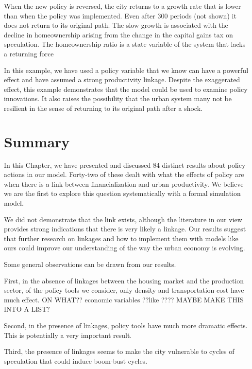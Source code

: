 {When the new policy is reversed, the city returns to a growth rate that is lower than when the policy was implemented. Even after 300 periods (not shown) it does not return to its original path. The slow growth is associated with the decline in homeownership arising from the change in the capital gains tax on speculation. 
The homeownership ratio is a state variable of the system that lacks a returning force

In this example, we have used a policy variable that we know can have a powerful effect and have assumed a strong productivity linkage. Despite the exaggerated effect, this example demonstrates that the model  could be used to examine policy innovations. It also raises the possibility that the urban system many not be resilient in the sense of returning to its original path after a shock.


\section{Summary}
In this Chapter, we have presented and discussed 84 distinct results about policy actions in our model. Forty-two of these dealt with what the effects of policy are when there is a link between financialization and urban productivity. We believe we are the first to explore this question systematically with a formal simulation model.


We did not demonstrate that the link exists, although the literature in our view provides strong indications that there is very likely a linkage.  Our results suggest that further research on linkages and how to implement them with models like ours could improve our understanding of the way the urban economy is evolving.   


Some general observations can be drawn from our results. 

First, in the absence of linkages between the housing market and the production sector, of the policy tools we consider, only density and transportation cost have much effect. {\color{red} ON WHAT??  economic variables ??like ???? MAYBE MAKE THIS INTO A LIST? }


Second, in the presence of linkages, policy tools have much more dramatic effects. This is potentially a very important result. 

Third, the presence of linkages seems to make the city vulnerable to cycles of speculation that could induce boom-bust cycles. 


}
